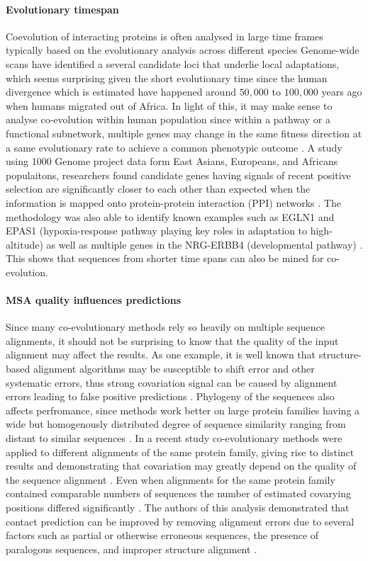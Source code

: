 \paragraph{Evolutionary timespan}
Coevolution of interacting proteins is often analysed in large time frames typically based on the evolutionary analysis across different species  \cite{qian2015recent}
Genome-wide scans have identified a several candidate loci that underlie local adaptations, which seems surprising given the short evolutionary time since the human divergence which is estimated have happened around $50,000$ to $100,000$ years ago when humans migrated out of Africa\cite{qian2015recent}.
In light of this, it may make sense to analyse co-evolution within human population
since within a pathway or a functional subnetwork, multiple genes may change in the same fitness direction at a same evolutionary rate to achieve a common phenotypic outcome \cite{qian2015recent}.
A study using 1000 Genome \cite{10002012integrated} project data form East Asians, Europeans, and Africans populaitons, researchers found candidate genes having signals of recent positive selection are significantly closer to each other than expected when the information is mapped onto protein-protein interaction (PPI) networks \cite{qian2015recent}.
The methodology was also able to identify known examples such as EGLN1 and EPAS1 (hypoxia-response pathway playing key roles in adaptation to high-altitude) as well as multiple genes in the NRG-ERBB4 (developmental pathway) \cite{qian2015recent}.
This shows that sequences from shorter time spans can also be mined for co-evolution.

\paragraph{MSA quality influences predictions}
Since many co-evolutionary methods rely so heavily on multiple sequence alignments, it should not be surprising to know that the quality of the input alignment may affect the results.
As one example, it is well known that structure-based alignment algorithms may be susceptible to shift error and other systematic errors, thus strong covariation signal can be caused by alignment errors leading to false positive predictions \cite{dickson2010identifying}.
Phylogeny of the sequences also affects perfromance, since methods work better on large protein families having a wide but homogenously distributed degree of sequence similarity ranging from distant to similar sequences \cite{de2013emerging}.
In a recent study co-evolutionary methods were applied to different alignments of the same protein family, giving rise to distinct results and demonstrating that covariation may greatly depend on the quality of the sequence alignment \cite{dickson2010identifying}.
Even when alignments for the same protein family contained comparable numbers of sequences the number of estimated covarying positions differed significantly \cite{dickson2010identifying}.
The authors of this analysis demonstrated that contact prediction can be improved by removing alignment errors due to several factors such as partial or otherwise erroneous sequences, the presence of paralogous sequences, and improper structure alignment \cite{dickson2010identifying}.

